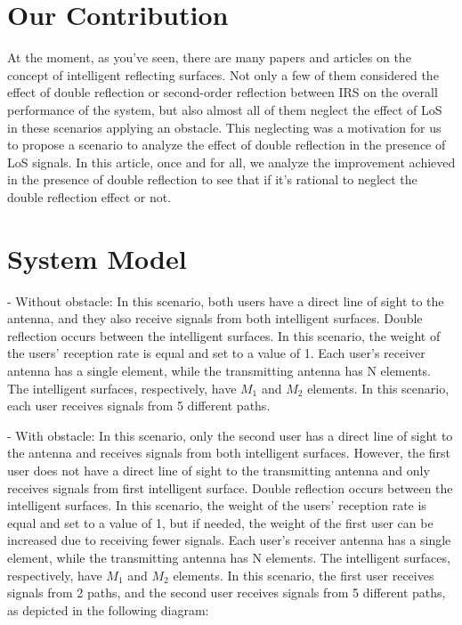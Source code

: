 \documentclass{article}
\begin{document}
\section{Our Contribution}
At the moment, as you've seen, there are many papers and articles on the concept of intelligent reflecting surfaces. Not only a few of them considered the effect of double reflection or second-order reflection between IRS on the overall performance of the system, but also almost all of them neglect the effect of LoS in these scenarios applying an obstacle.
This neglecting was a motivation for us to propose a scenario to analyze the effect of double reflection in the presence of LoS signals. 
In this article, once and for all, we analyze the improvement achieved in the presence of double reflection to see that if it's rational to
neglect the double reflection effect or not.
\section{System Model}
- Without obstacle: In this scenario, both users have a direct line of sight to the antenna, and they also receive signals from both intelligent surfaces. Double reflection occurs between the intelligent surfaces. In this scenario, the weight of the users' reception rate is equal and set to a value of 1. Each user's receiver antenna has a single element, while the transmitting antenna has N elements. The intelligent surfaces, respectively, have $M_1$ and $M_2$ elements. In this scenario, each user receives signals from 5 different paths.

- With obstacle: In this scenario, only the second user has a direct line of sight to the antenna and receives signals from both intelligent surfaces. However, the first user does not have a direct line of sight to the transmitting antenna and only receives signals from first intelligent surface. Double reflection occurs between the intelligent surfaces. In this scenario, the weight of the users' reception rate is equal and set to a value of 1, but if needed, the weight of the first user can be increased due to receiving fewer signals. Each user's receiver antenna has a single element, while the transmitting antenna has N elements. The intelligent surfaces, respectively, have $M_1$ and $M_2$ elements. In this scenario, the first user receives signals from 2 paths, and the second user receives signals from 5 different paths, as depicted in the following diagram:
\end{document}
